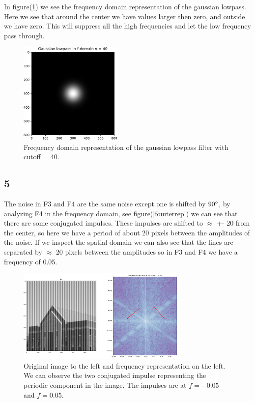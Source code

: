 {In figure(\ref{gausf-dom}) we see the frequency domain representation of the gaussian lowpass. Here we see that around the center we have values larger then zero, and outside we have zero. This will suppress all the high frequencies and let the low frequency pass through.


\begin{figure}[H]
    {\centering
        \includegraphics[width=0.45\textwidth]{gausf-dom.pdf}
        \caption{Frequency domain representation of the gaussian lowpass filter with cutoff = 40.}
        \label{gausf-dom}
    \par}
    \end{figure}




\subsection{5}


The noise in F3 and F4 are the same noise except one is shifted by $90\degree$, by analyzing F4 in the frequency domain, see figure(\ref{fourierrep}) we can see that there are some conjugated impulses. These impulses are shifted to $\approx$ +- 20 from the center, so here we have a period of about 20 pixels between the amplitudes of the noise. If we inspect the spatial domain we can also see that the lines are separated by $\approx$ 20 pixels between the amplitudes so in F3 and F4 we have a frequency of 0.05.

\begin{figure}[!htb]
    {\centering
        \includegraphics[width=0.75\textwidth]{simulatedperiod.png}
        \caption{Original image to the left and frequency representation on the left. We can observe the two conjugated impulse representing the periodic component in the image. The impulses are at $f = -0.05$ and $f = 0.05$.}
        \label{simulatedperiod}
    \par}
    \end{figure}




}
